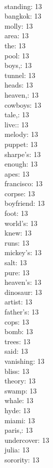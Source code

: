\begin{multicols}{6}
  \\ standing: 13
  \\ bangkok: 13
  \\ molly: 13
  \\ area: 13
  \\ the: 13
  \\ pool: 13
  \\ boys,: 13
  \\ tunnel: 13
  \\ heads: 13
  \\ heaven,: 13
  \\ cowboys: 13
  \\ tale,: 13
  \\ live:: 13
  \\ melody: 13
  \\ puppet: 13
  \\ sharpe's: 13
  \\ enough: 13
  \\ apes: 13
  \\ francisco: 13
  \\ corpse: 13
  \\ boyfriend: 13
  \\ foot: 13
  \\ world's: 13
  \\ knew: 13
  \\ runs: 13
  \\ mickey's: 13
  \\ salt: 13
  \\ pure: 13
  \\ heaven's: 13
  \\ dinosaur: 13
  \\ artist: 13
  \\ father's: 13
  \\ cops: 13
  \\ bomb: 13
  \\ trees: 13
  \\ said: 13
  \\ vanishing: 13
  \\ bliss: 13
  \\ theory: 13
  \\ swamp: 13
  \\ whale: 13
  \\ hyde: 13
  \\ miami: 13
  \\ paris,: 13
  \\ undercover: 13
  \\ julia: 13
  \\ sorority: 13

\end{multicols}
